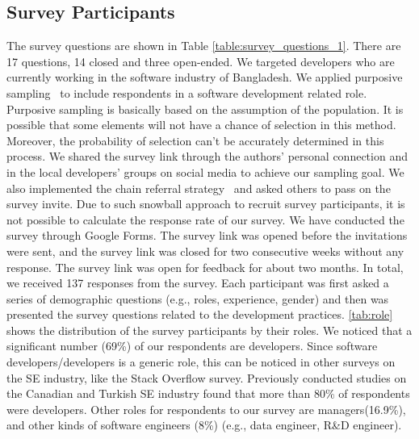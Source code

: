 \subsection{Survey Participants}
\label{survey_participants}
The survey questions are shown in Table \ref{table:survey_questions_1}. There are 17 questions, 14 closed and three open-ended.
We targeted developers who are currently working in the
software industry of Bangladesh. 
%
We applied purposive sampling~\citep{Vogt2005} to
include respondents in a software development related role. Purposive sampling
is basically based on the assumption of the population. It is possible that some
elements will not have a chance of selection in this method. Moreover, the
probability of selection can't be accurately determined in this process. We
shared the survey link through the authors' personal connection and in the local
developers' groups on social media to achieve our sampling goal. We also
implemented the chain referral strategy~\citep{creswell2013} and asked others to
pass on the survey invite. Due to such snowball approach to recruit survey participants, it is not possible to calculate the
response rate of our survey. We have conducted the survey through Google Forms. The survey link was opened
before the invitations were sent, and the survey link was closed for two
consecutive weeks without any response. The survey link was open for feedback
for about two months. In total, we
received 137 responses from the survey. Each participant was first asked a series of demographic questions (e.g., roles, experience, gender) and 
then was presented the survey questions related to the development practices. 
\tbl\ref{tab:role} shows the distribution of the survey participants by their
roles. We noticed that a significant number (69\%) of our respondents are
developers. Since software developers/developers is a generic role, this can be
noticed in other surveys on the SE industry, like the Stack Overflow
survey\citep{StackoverflowSurvey2020,StackoverflowSurvey2019}. Previously
conducted studies on the Canadian\citep{Garousi2013} and
Turkish\citep{Garousi2015} SE industry found that more than 80\% of respondents
were developers. Other roles for respondents to our survey are managers(16.9\%),
and other kinds of software engineers (8\%) (e.g., data engineer, R\&D
engineer).

